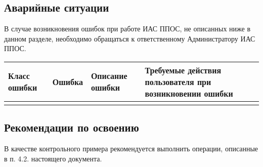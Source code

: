 \subsection{Аварийные ситуации}
В случае возникновения ошибок при работе ИАС ППОС, не описанных ниже в данном разделе, необходимо обращаться к ответственному Администратору ИАС ППОС.
\begin{longtable}{|p{3cm}|p{3cm}|p{3cm}|p{6cm}|}
\hline
Класс ошибки & Ошибка & Описание ошибки & Требуемые действия пользователя при возникновении ошибки\\
\hline
 &   &  & \\
\hline
\end{longtable}

\subsection{Рекомендации по освоению}
В качестве контрольного примера рекомендуется выполнить операции, описанные в п. 4.2. настоящего документа.

\newpage